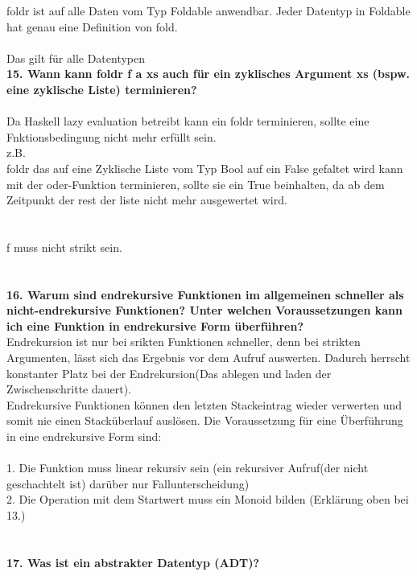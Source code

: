\documentclass{article}
\begin{document}
foldr ist auf alle Daten vom Typ Foldable anwendbar. Jeder Datentyp in Foldable hat genau eine Definition von fold.
\\
\\
Das gilt für alle Datentypen
\\
\textbf{15. Wann kann foldr f a xs auch für ein zyklisches Argument xs (bspw. eine zyklische Liste) terminieren?}\\
\\
Da Haskell lazy evaluation betreibt kann ein foldr terminieren, sollte eine Fnktionsbedingung nicht mehr erf\"ullt sein.\\
z.B.\\
foldr das auf eine Zyklische Liste vom Typ Bool auf ein False gefaltet wird kann mit der oder-Funktion terminieren, sollte sie ein True beinhalten, da ab dem Zeitpunkt der rest der liste nicht mehr ausgewertet wird. 
\\
\\
\\
f muss nicht strikt sein.\\
\\
\\
\textbf{16. Warum sind endrekursive Funktionen im allgemeinen schneller als nicht-endrekursive Funktionen? Unter welchen Voraussetzungen kann ich eine Funktion in endrekursive Form überführen?}
\\
Endrekursion ist nur bei srikten Funktionen schneller, denn bei strikten Argumenten, lässt sich das Ergebnis vor dem Aufruf auswerten. Dadurch herrscht konstanter Platz bei der Endrekursion(Das ablegen und laden der Zwischenschritte dauert).\\
Endrekursive Funktionen können den letzten Stackeintrag wieder verwerten und somit nie einen Stacküberlauf auslösen. Die Voraussetzung für eine Überführung in eine endrekursive Form sind:\\
\\
1. Die Funktion muss linear rekursiv sein (ein rekursiver Aufruf(der nicht geschachtelt ist) dar\"uber nur Fallunterscheidung)\\
2. Die Operation mit dem Startwert muss ein Monoid bilden (Erklärung oben bei 13.)\\
\\
\\
\textbf{17. Was ist ein abstrakter Datentyp (ADT)?}
\\
\end{document}
